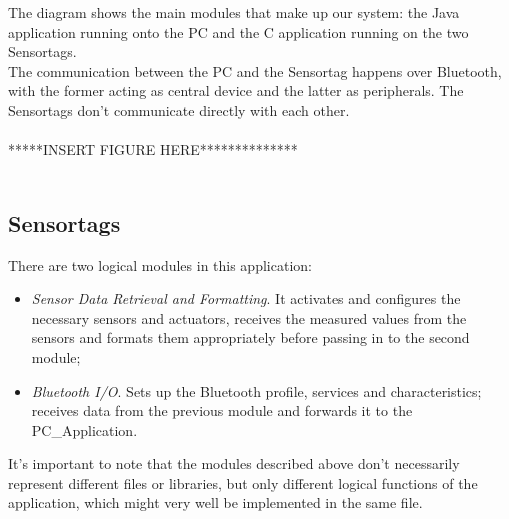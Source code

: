 \documentclass[conference,12pt]{IEEETran}
\begin{document}
The diagram shows the main modules that make up our system: the Java application running onto the PC and the C application running on the two Sensortags.\\
The communication between the PC and the Sensortag happens over Bluetooth, with the former acting as central device and the latter as peripherals. The Sensortags don’t communicate directly with each other.\\\\
*****INSERT FIGURE HERE**************\\\\

\subsection{Sensortags}
There are two logical modules in this application:

\begin{itemize}
	\item \textit{Sensor Data Retrieval and Formatting}. It activates and configures the necessary sensors and actuators, receives the measured values from the sensors and formats them appropriately before passing in to the second module;
	\item \textit{Bluetooth I/O}. Sets up the Bluetooth profile, services and characteristics; receives data from the previous module and forwards it to the PC\_Application.
\end{itemize}
It’s important to note that the modules described above don’t necessarily represent different files or libraries, but only different logical functions of the application, which might very well be implemented in the same file.
\end{document}
